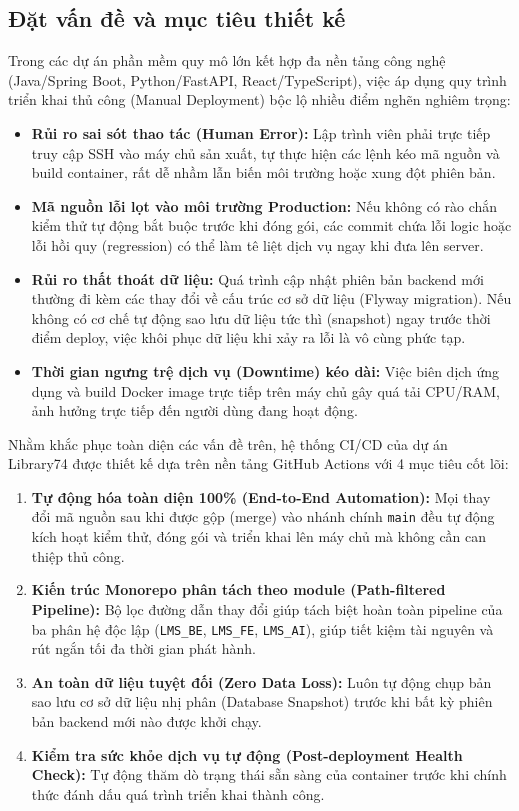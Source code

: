 \subsection{Đặt vấn đề và mục tiêu thiết kế}

Trong các dự án phần mềm quy mô lớn kết hợp đa nền tảng công nghệ (Java/Spring Boot, Python/FastAPI, React/TypeScript), việc áp dụng quy trình triển khai thủ công (Manual Deployment) bộc lộ nhiều điểm nghẽn nghiêm trọng:
\begin{itemize}[noitemsep]
    \item \textbf{Rủi ro sai sót thao tác (Human Error):} Lập trình viên phải trực tiếp truy cập SSH vào máy chủ sản xuất, tự thực hiện các lệnh kéo mã nguồn và build container, rất dễ nhầm lẫn biến môi trường hoặc xung đột phiên bản.
    \item \textbf{Mã nguồn lỗi lọt vào môi trường Production:} Nếu không có rào chắn kiểm thử tự động bắt buộc trước khi đóng gói, các commit chứa lỗi logic hoặc lỗi hồi quy (regression) có thể làm tê liệt dịch vụ ngay khi đưa lên server.
    \item \textbf{Rủi ro thất thoát dữ liệu:} Quá trình cập nhật phiên bản backend mới thường đi kèm các thay đổi về cấu trúc cơ sở dữ liệu (Flyway migration). Nếu không có cơ chế tự động sao lưu dữ liệu tức thì (snapshot) ngay trước thời điểm deploy, việc khôi phục dữ liệu khi xảy ra lỗi là vô cùng phức tạp.
    \item \textbf{Thời gian ngưng trệ dịch vụ (Downtime) kéo dài:} Việc biên dịch ứng dụng và build Docker image trực tiếp trên máy chủ gây quá tải CPU/RAM, ảnh hưởng trực tiếp đến người dùng đang hoạt động.
\end{itemize}

Nhằm khắc phục toàn diện các vấn đề trên, hệ thống CI/CD của dự án Library74 được thiết kế dựa trên nền tảng GitHub Actions với 4 mục tiêu cốt lõi:
\begin{enumerate}[noitemsep]
    \item \textbf{Tự động hóa toàn diện 100\% (End-to-End Automation):} Mọi thay đổi mã nguồn sau khi được gộp (merge) vào nhánh chính \texttt{main} đều tự động kích hoạt kiểm thử, đóng gói và triển khai lên máy chủ mà không cần can thiệp thủ công.
    \item \textbf{Kiến trúc Monorepo phân tách theo module (Path-filtered Pipeline):} Bộ lọc đường dẫn thay đổi giúp tách biệt hoàn toàn pipeline của ba phân hệ độc lập (\texttt{LMS\_BE}, \texttt{LMS\_FE}, \texttt{LMS\_AI}), giúp tiết kiệm tài nguyên và rút ngắn tối đa thời gian phát hành.
    \item \textbf{An toàn dữ liệu tuyệt đối (Zero Data Loss):} Luôn tự động chụp bản sao lưu cơ sở dữ liệu nhị phân (Database Snapshot) trước khi bất kỳ phiên bản backend mới nào được khởi chạy.
    \item \textbf{Kiểm tra sức khỏe dịch vụ tự động (Post-deployment Health Check):} Tự động thăm dò trạng thái sẵn sàng của container trước khi chính thức đánh dấu quá trình triển khai thành công.
\end{enumerate}

